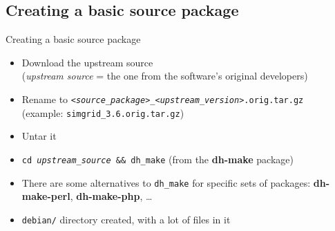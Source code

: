 \documentclass[10pt,final]{beamer}
\begin{document}
\subsection{Creating a basic source package}
\begin{frame}{Creating a basic source package}
  \begin{itemize}
  \item Download the upstream source\\
    (\textsl{upstream source} = the one from the software's original developers)
    \hbr
  \item Rename to \texttt{<\textsl{source\_package}>\_<\textsl{upstream\_version}>.orig.tar.gz}\\
    (example: \texttt{simgrid\_3.6.orig.tar.gz})
    \hbr
  \item Untar it
    \hbr
  \item \texttt{cd \textsl{upstream\_source} \&\& dh\_make} (from the \textbf{dh-make} package)
    \hbr
  \item There are some alternatives to \texttt{dh\_make} for specific sets of
    packages: \textbf{dh-make-perl}, \textbf{dh-make-php}, \ldots \hbr
  \item \texttt{debian/} directory created, with a lot of files in it
  \end{itemize}
\end{frame}
\end{document}
